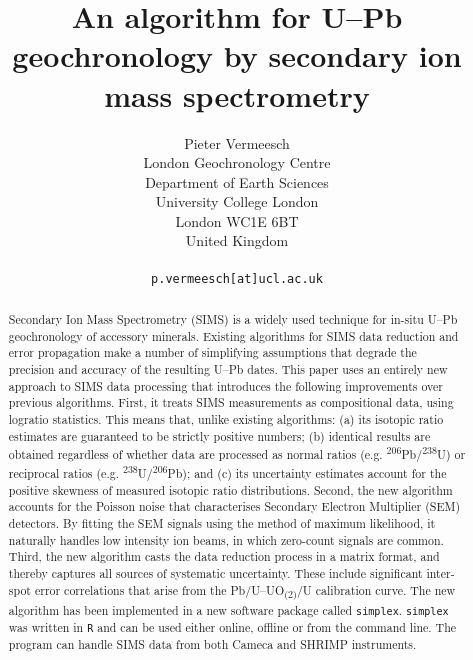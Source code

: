 \documentclass{article}
\begin{document}
\title{An algorithm for U--Pb geochronology by secondary ion mass spectrometry}

\author{Pieter Vermeesch\\
  London Geochronology Centre\\
  Department of Earth Sciences\\
  University College London\\
  London WC1E 6BT\\
  United Kingdom\\~\\
  \texttt{p.vermeesch[at]ucl.ac.uk}
}

\maketitle

\begin{abstract}
  Secondary Ion Mass Spectrometry (SIMS) is a widely used technique
  for in-situ U--Pb geochronology of accessory minerals. Existing
  algorithms for SIMS data reduction and error propagation make a
  number of simplifying assumptions that degrade the precision and
  accuracy of the resulting U--Pb dates. This paper uses an entirely
  new approach to SIMS data processing that introduces the following
  improvements over previous algorithms. First, it treats SIMS
  measurements as compositional data, using logratio statistics. This
  means that, unlike existing algorithms: (a) its isotopic ratio
  estimates are guaranteed to be strictly positive numbers; (b)
  identical results are obtained regardless of whether data are
  processed as normal ratios
  (e.g. \textsuperscript{206}Pb/\textsuperscript{238}U) or reciprocal
  ratios (e.g. \textsuperscript{238}U/\textsuperscript{206}Pb); and
  (c) its uncertainty estimates account for the positive skewness of
  measured isotopic ratio distributions. Second, the new algorithm
  accounts for the Poisson noise that characterises Secondary Electron
  Multiplier (SEM) detectors. By fitting the SEM signals using the
  method of maximum likelihood, it naturally handles low intensity ion
  beams, in which zero-count signals are common. Third, the new
  algorithm casts the data reduction process in a matrix format, and
  thereby captures all sources of systematic uncertainty.  These
  include significant inter-spot error correlations that arise from
  the Pb/U--UO\textsubscript{(2)}/U calibration curve.  The new
  algorithm has been implemented in a new software package called
  \texttt{simplex}. \texttt{simplex} was written in \texttt{R} and can
  be used either online, offline or from the command line. The program
  can handle SIMS data from both Cameca and SHRIMP instruments.
\end{abstract}
\end{document}
